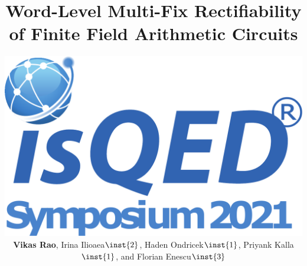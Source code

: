 \documentclass[xcolor=dvipsnames]{beamer}
\begin{document}
\title[]{Word-Level Multi-Fix Rectifiability of Finite Field Arithmetic Circuits}

\author[]{
\includegraphics[scale=0.10]{ISQED_logo.pdf}\\
 {\bf Vikas Rao}, Irina Ilioaea$\inst{2}$, Haden Ondricek$\inst{1}$, Priyank Kalla$\inst{1}$,  and Florian Enescu$\inst{3}$} 
\date{}




\begin{frame}[plain]
  \titlepage
\end{frame}



\end{document}
